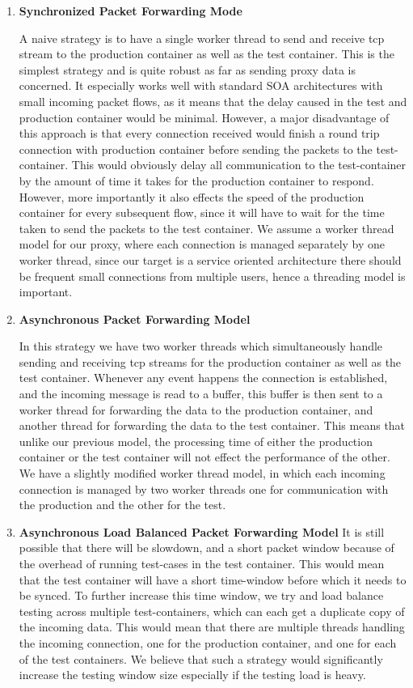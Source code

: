 \begin{enumerate}

\item \textbf{Synchronized Packet Forwarding Mode}

A naive strategy is to have a single worker thread to send and receive tcp stream to the production container as well as the test container.
This is the simplest strategy and is quite robust as far as sending proxy data is concerned. 
It especially works well with standard SOA architectures with small incoming packet flows, as it means that the delay caused in the test and production container would be minimal.
However, a major disadvantage of this approach is that every connection received would finish a round trip connection with production container before sending the packets to the test-container.
This would obviously delay all communication to the test-container by the amount of time it takes for the production container to respond. 
However, more importantly it also effects the speed of the production container for every subsequent flow, since it will have to wait for the time taken to send the packets to the test container.
We assume a worker thread model for our proxy, where each connection is managed separately by one worker thread, since our target is a service oriented architecture there should be frequent small connections from multiple users, hence a threading model is important.

  \item \textbf{Asynchronous Packet Forwarding Model}

In this strategy we have two worker threads which simultaneously handle sending and receiving tcp streams for the production container as well as the test container.
Whenever any event happens the connection is established, and the incoming message is read to a buffer, this buffer is then sent to a worker thread for forwarding the data to the production container, and another thread for forwarding the data to the test container. 
This means that unlike our previous model, the processing time of either the production container or the test container will not effect the performance of the other.
We have a slightly modified worker thread model, in which each incoming connection is managed by two worker threads one for communication with the production and the other for the test.

  \item \textbf{Asynchronous Load Balanced Packet Forwarding Model}
It is still possible that there will be slowdown, and a short packet window because of the overhead of running test-cases in the test container. 
This would mean that the test container will have a short time-window before which it needs to be synced.
To further increase this time window, we try and load balance testing across multiple test-containers, which can each get a duplicate copy of the incoming data. 
This would mean that there are multiple threads handling the incoming connection, one for the production container, and one for each of the test containers.
We believe that such a strategy would significantly increase the testing window size especially if the testing load is heavy.

\end{enumerate}

